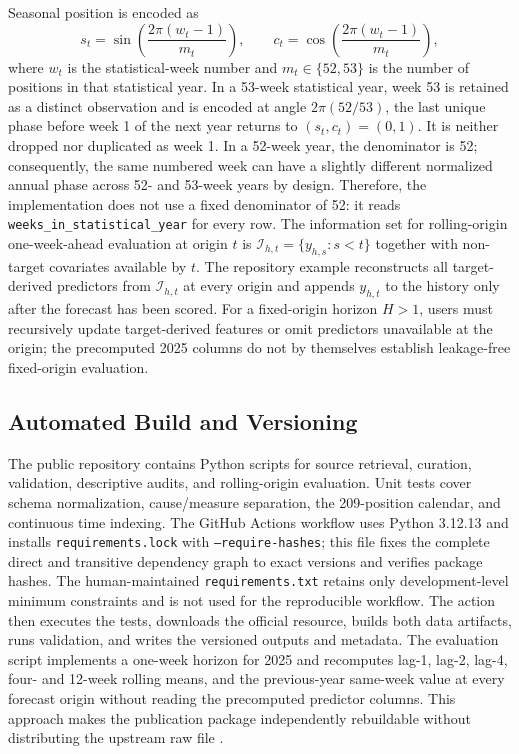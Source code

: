 \documentclass[data,datadescriptor,submit,moreauthors,pdftex]{Definitions/mdpi}
\begin{document}
Seasonal position is encoded as
\begin{equation}
s_t=\sin\left(\frac{2\pi (w_t-1)}{m_t}\right), \qquad c_t=\cos\left(\frac{2\pi (w_t-1)}{m_t}\right),
\end{equation}
where $w_t$ is the statistical-week number and $m_t\in\{52,53\}$ is the number of positions in that statistical year. In a 53-week statistical year, week 53 is retained as a distinct observation and is encoded at angle $2\pi(52/53)$, the last unique phase before week 1 of the next year returns to $(s_t,c_t)=(0,1)$. It is neither dropped nor duplicated as week 1. In a 52-week year, the denominator is 52; consequently, the same numbered week can have a slightly different normalized annual phase across 52- and 53-week years by design. Therefore, the implementation does not use a fixed denominator of 52: it reads \texttt{weeks\_in\_statistical\_year} for every row. The information set for rolling-origin one-week-ahead evaluation at origin $t$ is $\mathcal{I}_{h,t}=\{y_{h,s}:s<t\}$ together with non-target covariates available by $t$. The repository example reconstructs all target-derived predictors from $\mathcal{I}_{h,t}$ at every origin and appends $y_{h,t}$ to the history only after the forecast has been scored. For a fixed-origin horizon $H>1$, users must recursively update target-derived features or omit predictors unavailable at the origin; the precomputed 2025 columns do not by themselves establish leakage-free fixed-origin evaluation.
\endgroup

\subsection{Automated Build and Versioning}

The public repository contains Python scripts for source retrieval, curation, validation, descriptive audits, and rolling-origin evaluation. Unit tests cover schema normalization, cause/measure separation, the 209-position calendar, and continuous time indexing. The GitHub Actions workflow uses Python 3.12.13 and installs \texttt{requirements.lock} with \texttt{--require-hashes}; this file fixes the complete direct and transitive dependency graph to exact versions and verifies package hashes. The human-maintained \texttt{requirements.txt} retains only development-level minimum constraints and is not used for the reproducible workflow. The action then executes the tests, downloads the official resource, builds both data artifacts, runs validation, and writes the versioned outputs and metadata. The evaluation script implements a one-week horizon for 2025 and recomputes lag-1, lag-2, lag-4, four- and 12-week rolling means, and the previous-year same-week value at every forecast origin without reading the precomputed predictor columns. This approach makes the publication package independently rebuildable without distributing the upstream raw file \citep{Kim2022GitHub,Braga2023}.
\end{document}

